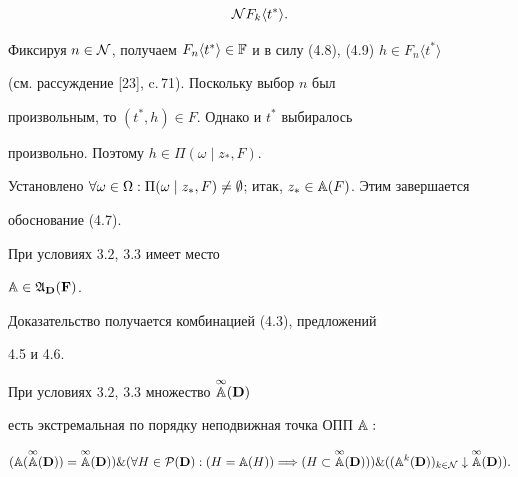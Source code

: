 \begin{pf}
\begin{equation}
{{{\cal N}}}{F_k}\langle{t^*}\rangle.


\end{equation}


Фиксируя $n \in {\cal N}$, получаем ${F_n}\langle{t^*}\rangle \in


{\Bbb F}$ и в силу (4.8), (4.9) $h \in {F_n}\langle{t^*}\rangle$


(см. рассуждение [23], c.\,71). Поскольку выбор $n$ был


произвольным, то $({t^*},h) \in F$. Однако и $t^*$ выбиралось


произвольно. Поэтому $h \in {\Pi}(\omega \mid {z_*},F)$.


Установлено $\fo{\omega} \in \Om:{\Pi}(\omega \mid {z_*},F) \ne


\emp$; итак, ${z_*} \in {{\Bbb A}(F)}$. Этим завершается


обоснование (4.7).


\end{pf}





\begin{props}


При условиях $3.2$, $3.3$ имеет место


${\Bbb A} \in {{\frak A}_{\bold D}}({\bold F})$.


\end{props}





Доказательство получается комбинацией (4.3), предложений


4.5 и 4.6.





\begin{thms}


При условиях $3.2$, $3.3$ множество $\overset{\infty}{\Bbb A}{}({\bold D})$


есть экстремальная по порядку неподвижная точка ОПП ${\Bbb A}:$


$$


({\Bbb A}(\up{\infty}{\Bbb A}({\bold D})) =


\up{\infty}{\Bbb A}({\bold D})) \& (\fo{H} \in


{\cal P}({\bold D}):(H = {{\Bbb A}(H)}) \Lo (H \subset


\up{\infty}{\Bbb A}({\bold D}))) \&


({({{\Bbb A}^k}({\bold D}))_{k \in {\cal N}}} \downarrow


\up{\infty}{\Bbb A}({\bold D})).


$$


\end{thms}





